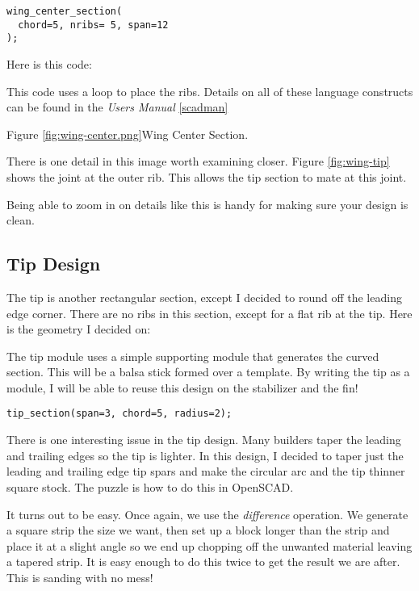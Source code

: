 \begin{lstlisting}
wing_center_section(
  chord=5, nribs= 5, span=12
);
\end{lstlisting}

Here is this code:


This code uses a loop to place the ribs. Details on all of these language
constructs can be found in the {\it Users Manual} \ref{scadman}

Figure \ref{fig:wing-center.png}{Wing Center Section}.


There is one detail in this image worth examining closer. Figure
\ref{fig:wing-tip} shows the joint at the outer rib. This allows the tip section
to mate at this joint.


Being able to zoom in on details like this is handy for making sure your design
is clean.

\subsection*{Tip Design}

The tip is another rectangular section, except I decided to round off the
leading edge corner. There are no ribs in this section, except for a flat rib
at the tip. Here is the geometry I decided on:


The tip module uses a simple supporting module that generates the curved section.
This will be a balsa stick formed over a template.  By writing the tip as a
module, I will be able to reuse this design on the stabilizer and the fin!

\begin{lstlisting}
tip_section(span=3, chord=5, radius=2);
\end{lstlisting}

There is one interesting issue in the tip design. Many builders taper the
leading and trailing edges so the tip is lighter. In this design, I decided to
taper just the leading and trailing edge tip spars and make the circular arc
and the tip thinner square stock. The puzzle is how to do this in OpenSCAD.

It turns out to be easy. Once again, we use the {\it difference} operation. We
generate a square strip the size we want, then set up a block longer than the
strip and place it at a slight angle so we end up chopping off the unwanted
material leaving a tapered strip. It is easy enough to do this twice to get the
result we are after. This is sanding with no mess!

